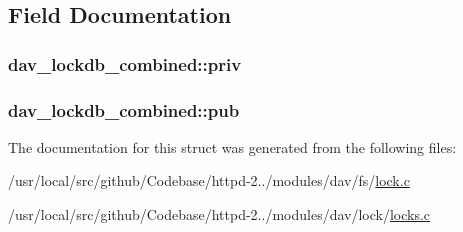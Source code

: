 \subsection{Field Documentation}
\subsubsection[{\texorpdfstring{priv}{priv}}]{ dav\+\_\+lockdb\+\_\+combined\+::priv}\hypertarget{structdav__lockdb__combined_a4ce88b1cbe795eff679a0903e14a6209}{}\label{structdav__lockdb__combined_a4ce88b1cbe795eff679a0903e14a6209}
\subsubsection[{\texorpdfstring{pub}{pub}}]{ dav\+\_\+lockdb\+\_\+combined\+::pub}\hypertarget{structdav__lockdb__combined_a1e4c8ec31151ff74c6a66de9fca7f707}{}\label{structdav__lockdb__combined_a1e4c8ec31151ff74c6a66de9fca7f707}


The documentation for this struct was generated from the following files\+:\begin{DoxyCompactItemize}
\item 
/usr/local/src/github/\+Codebase/httpd-\/2../modules/dav/fs/\hyperlink{lock_8c}{lock.\+c}\item 
/usr/local/src/github/\+Codebase/httpd-\/2../modules/dav/lock/\hyperlink{locks_8c}{locks.\+c}\end{DoxyCompactItemize}

